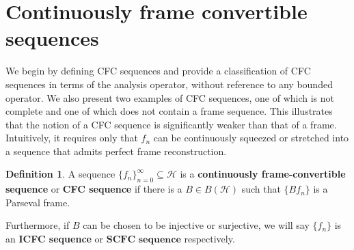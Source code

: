 \documentclass[11pt]{amsart}
\theoremstyle{definition}
\newtheorem{def_n}[thm]{Definition}
\numberwithin{equation}{section}
\newcommand{\Hcal}{\mathcal{H}} %
\begin{document}
\section{Continuously frame convertible sequences}\label{3}

We begin by defining CFC sequences and provide a classification of CFC sequences in terms of the analysis operator, without reference to any bounded operator. We also present two examples of CFC sequences, one of which is not complete and one of which does not contain a frame sequence. This illustrates that the notion of a CFC sequence is significantly weaker than that of a frame. Intuitively, it requires only that ${f_n}$ can be continuously squeezed or stretched into a sequence that admits perfect frame reconstruction.

\begin{def_n}
A sequence $\{f_n\}_{n=0}^{\infty}\subseteq \Hcal$ is a \textbf{continuously frame-convertible sequence} or \textbf{CFC sequence} if there is a $B\in B(\Hcal)$ such that $\{Bf_n\}$ is a Parseval frame.

Furthermore, if $B$ can be chosen to be injective or surjective, we will say $\{f_n\}$ is an \textbf{ICFC sequence} or $\textbf{SCFC sequence}$ respectively.
\end{def_n}
\end{document}

